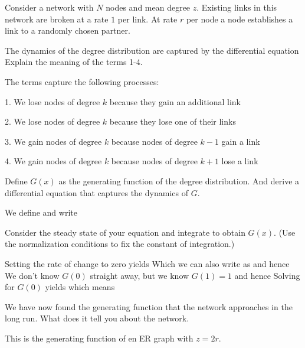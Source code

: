 Consider a network with $N$ nodes and mean degree $z$. Existing links in this network are broken at a rate $1$ per link. At rate $r$ per node a node establishes a link to a randomly chosen partner. 

\subquestion
The dynamics of the degree distribution are captured by the differential equation 
Explain the meaning of the terms 1-4.

\solution 
The terms capture the following processes:

 1. We lose nodes of degree $k$ because they gain an additional link
 
 2. We lose nodes of degree $k$ because they lose one of their links
 
 3.  We gain nodes of degree $k$ because nodes of degree $k-1$ gain a link
 
 4. We gain nodes of degree $k$ because nodes of degree $k+1$ lose a link

\subquestion
Define $G(x)$ as the generating function of the degree distribution. And derive a differential equation that captures the dynamics of $G$.

\solution
We define
and write 

\subquestion
Consider the steady state of your equation and integrate to obtain $G(x)$. (Use the normalization conditions to fix the constant of integration.) 

\solution
Setting the rate of change to zero yields
Which we can also write as 
and hence 
We don't know $G(0)$ straight away, but we know $G(1)=1$ and hence
Solving for $G(0)$ yields
which means 

\subquestion 
We have now found the generating function that the network approaches in the long run. What does it tell you about the network.  

\solution
This is the generating function of en ER graph with $z=2r$.